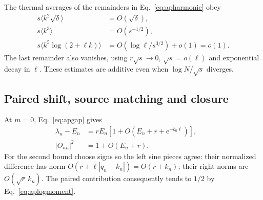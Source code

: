 \documentclass[aps,pra,reprint,superscriptaddress,longbibliography]{revtex4-2}
\newcommand{\ee}{\mathrm e}
\begin{document}
The thermal averages of the remainders in
Eq.~\eqref{eq:apharmonic} obey
\begin{align}
 s\langle k^2\sqrt\delta\rangle&=O(\sqrt\delta),\nonumber\\
 s\langle k^3\rangle&=O(s^{-1/2}),\nonumber\\
 s\langle k^5\log(2+\ell k)\rangle
                  &=O(\log\ell/s^{3/2})+o(1)=o(1).       \label{eq:aplogerrors}
\end{align}
The last remainder also vanishes, using $r\sqrt s\to0$,
$\sqrt s=o(\ell)$ and exponential decay in $\ell$. These estimates
are additive even when $\log N/\sqrt s$ diverges.

\subsection{Paired shift, source matching and closure}

At $m=0$, Eq.~\eqref{eq:apgap} gives
\begin{equation}
 \begin{aligned}
 \lambda_n-E_n&=rE_n[1+O(E_n+r+\ee^{-b_0\ell})],\qquad\\
 |O_{nn}|^2&=1+O(E_n+r).
 \end{aligned}                                         \label{eq:appaired}
\end{equation}
For the second bound choose signs so the left sine pieces agree:
their normalized difference has norm
$O(r+\ell|q_n-k_n|)=O(r+k_n)$; their right norms are
$O(\sqrt r\,k_n)$. The paired contribution consequently tends to
$1/2$ by Eq.~\eqref{eq:aplogmoment}.
\end{document}
